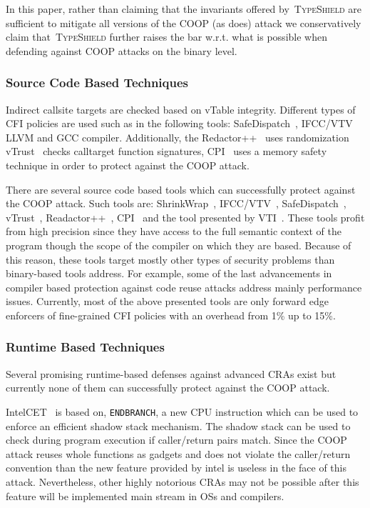 In this paper, rather than claiming that the invariants offered by~\textsc{TypeShield} are sufficient
to mitigate all versions of the COOP (as \cite{veen:typearmor} does) attack we conservatively claim that~\textsc{TypeShield} 
further raises the bar w.r.t. what is possible when defending against COOP attacks on the binary level.

\subsubsection{Source Code Based Techniques} Indirect callsite targets are checked based on vTable integrity.
Different types of CFI policies are used such as in the following tools:
SafeDispatch~\cite{safedispatch:jang}, IFCC/VTV~\cite{vtv:tice} LLVM and GCC compiler.
Additionally, the Redactor++~\cite{crane:readactor++} uses randomization 
vTrust~\cite{zhang:vtrust} checks calltarget function signatures, 
CPI~\cite{volodymyr:cpi} uses a memory safety technique
in order to protect against the COOP attack.

There are several source code based tools 
which can successfully protect against the COOP attack.
Such tools are: ShrinkWrap~\cite{haller:shrinkwrap}, IFCC/VTV~\cite{vtv:tice}, 
SafeDispatch~\cite{safedispatch:jang}, vTrust~\cite{zhang:vtrust}, Readactor++~\cite{crane:readactor++}, CPI~\cite{volodymyr:cpi} and the
tool presented by VTI~\cite{bounov:interleaving}. These tools profit from high precision
since they have access to the full semantic context of the program though the scope
of the compiler on which they are based. 
Because of this reason, these tools target mostly other types of security problems than binary-based 
tools address. For example, some of the last advancements in compiler based protection against code reuse attacks address mainly performance issues.
Currently, most of the above presented tools are only forward edge enforcers of fine-grained CFI policies with an overhead from 1\% up to 15\%.

\subsubsection{Runtime Based Techniques}
Several promising runtime-based defenses against advanced CRAs exist but currently none of them can successfully
protect against the COOP attack.

IntelCET~\cite{intel:cet} is based on, \texttt{ENDBRANCH}, a new CPU instruction which can be used to enforce
an efficient shadow stack mechanism. The shadow stack can be used to check during program execution if caller/return pairs match.
Since the COOP attack reuses whole functions as gadgets and does not violate the caller/return convention than the 
new feature provided by intel is useless in the face of this attack. Nevertheless, other highly notorious CRAs may not be possible
after this feature will be implemented main stream in OSs and compilers.


